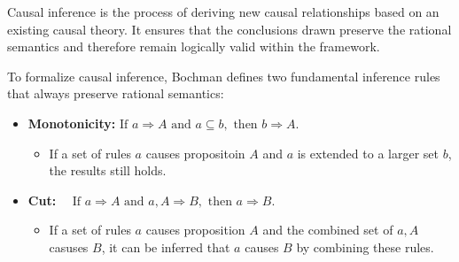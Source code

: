 \documentclass[seminar,palatino,english]{AIGpaper}
\newcommand{\ignore}[1]{}
\begin{document}
\ignore{
    \begin{itemize}
        \item Derivations for semantics.
        \item Monotonicity, Cut.
        \item No reflexivity.
    \end{itemize}
    \begin{itemize}
        \item Core rules:
        \begin{itemize}
            \item Monotonicity.
            \item Cut.
        \end{itemize}
    \end{itemize}
}

Causal inference is the process of deriving new causal relationships based on an existing causal theory. It ensures that the conclusions drawn preserve the rational semantics and therefore remain logically valid within the framework.


To formalize causal inference, Bochman defines two fundamental inference rules that always preserve rational semantics:

\begin{itemize}
    \item \textbf{Monotonicity:} $\text{If } a \Rightarrow A \text{ and } a \subseteq b, \text{ then } b \Rightarrow A. $
    \begin{itemize}
        \item If a set of rules $a$ causes propositoin $A$ and $a$ is extended to a larger set $b$, the results still holds.
    \end{itemize}
    \item \textbf{Cut:} $\quad \text{If } a \Rightarrow A \text{ and } a, A \Rightarrow B, \text{ then } a \Rightarrow B$.
    \begin{itemize}
        \item If a set of rules $a$ causes proposition $A$ and the combined set of $a,A$ casuses $B$, it can be inferred that $a$ causes $B$ by combining these rules.
    \end{itemize}
\end{itemize}
\end{document}
